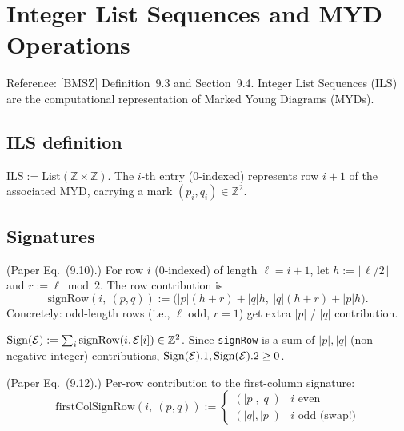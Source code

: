 \chapter{Integer List Sequences and MYD Operations}
\label{chap:ils}

Reference: [BMSZ] Definition~9.3 and Section~9.4. Integer List Sequences (ILS)
are the computational representation of Marked Young Diagrams (MYDs).

\section{ILS definition}

\begin{definition}[ILS]
  \label{def:ILS}
  \leanok
  $\mathrm{ILS} := \mathrm{List}(\mathbb{Z} \times \mathbb{Z})$. The $i$-th entry
  (0-indexed) represents row $i + 1$ of the associated MYD, carrying a mark
  $(p_i, q_i) \in \mathbb{Z}^2$.
\end{definition}

\section{Signatures}

\begin{definition}
  \label{def:signRow}
  \leanok
  (Paper Eq.~(9.10).) For row $i$ (0-indexed) of length $\ell = i + 1$,
  let $h := \lfloor \ell / 2 \rfloor$ and $r := \ell \bmod 2$. The row contribution is
  \[
    \mathrm{signRow}(i,\ (p, q)) := \big(|p|(h + r) + |q| h,\ |q|(h + r) + |p| h\big).
  \]
  Concretely: odd-length rows (i.e., $\ell$ odd, $r = 1$) get extra $|p|$ / $|q|$ contribution.
\end{definition}

\begin{definition}
  \label{def:sign}
  \leanok
  $\mathrm{Sign}(\mathcal{E}) := \sum_{i} \mathrm{signRow}(i, \mathcal{E}[i]) \in \mathbb{Z}^2$.
  Since \texttt{signRow} is a sum of $|p|, |q|$ (non-negative integer)
  contributions, $\mathrm{Sign}(\mathcal{E}).1, \mathrm{Sign}(\mathcal{E}).2 \geq 0$.
\end{definition}

\begin{definition}
  \label{def:firstColSignRow}
  \leanok
  (Paper Eq.~(9.12).) Per-row contribution to the first-column signature:
  \[
    \mathrm{firstColSignRow}(i,\ (p, q)) :=
    \begin{cases}
      (|p|, |q|) & i\text{ even} \\
      (|q|, |p|) & i\text{ odd (swap!)}
    \end{cases}
  \]
\end{definition}

